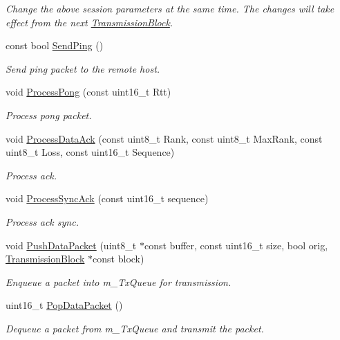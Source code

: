 \begin{DoxyCompactItemize}
\begin{DoxyCompactList}\small\item\em Change the above session parameters at the same time. The changes will take effect from the next \hyperlink{class_network_coding_1_1_transmission_block}{Transmission\+Block}. \end{DoxyCompactList}\item 
const bool \hyperlink{class_network_coding_1_1_transmission_session_a732d177580449a1473cea103465b1c5b}{Send\+Ping} ()
\begin{DoxyCompactList}\small\item\em Send ping packet to the remote host. \end{DoxyCompactList}\item 
void \hyperlink{class_network_coding_1_1_transmission_session_a208883657ae7c03b6405fd949bc06d7a}{Process\+Pong} (const uint16\+\_\+t Rtt)
\begin{DoxyCompactList}\small\item\em Process pong packet. \end{DoxyCompactList}\item 
void \hyperlink{class_network_coding_1_1_transmission_session_a31f038cb688e2e95e40f63821baf34a8}{Process\+Data\+Ack} (const uint8\+\_\+t Rank, const uint8\+\_\+t Max\+Rank, const uint8\+\_\+t Loss, const uint16\+\_\+t Sequence)
\begin{DoxyCompactList}\small\item\em Process ack. \end{DoxyCompactList}\item 
void \hyperlink{class_network_coding_1_1_transmission_session_adf9cb35f78ec3f03d92ec4d46faa1c66}{Process\+Sync\+Ack} (const uint16\+\_\+t sequence)
\begin{DoxyCompactList}\small\item\em Process ack sync. \end{DoxyCompactList}\item 
void \hyperlink{class_network_coding_1_1_transmission_session_ae248b2c48a54243ce1e47837337231df}{Push\+Data\+Packet} (uint8\+\_\+t $\ast$const buffer, const uint16\+\_\+t size, bool orig, \hyperlink{class_network_coding_1_1_transmission_block}{Transmission\+Block} $\ast$const block)
\begin{DoxyCompactList}\small\item\em Enqueue a packet into m\+\_\+\+Tx\+Queue for transmission. \end{DoxyCompactList}\item 
uint16\+\_\+t \hyperlink{class_network_coding_1_1_transmission_session_adeda0f8096e8fa5845d4f0377193cf73}{Pop\+Data\+Packet} ()
\begin{DoxyCompactList}\small\item\em Dequeue a packet from m\+\_\+\+Tx\+Queue and transmit the packet. \end{DoxyCompactList}\end{DoxyCompactItemize}
